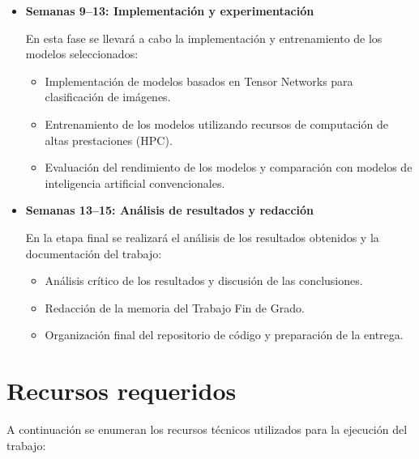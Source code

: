 \begin{itemize}
\item \textbf{Semanas 9--13: Implementación y experimentación}

En esta fase se llevará a cabo la implementación y entrenamiento de los modelos seleccionados:
\begin{itemize}
\item Implementación de modelos basados en Tensor Networks para clasificación de imágenes.
\item Entrenamiento de los modelos utilizando recursos de computación de altas prestaciones (HPC).
\item Evaluación del rendimiento de los modelos y comparación con modelos de inteligencia artificial convencionales.
\end{itemize}

\item \textbf{Semanas 13--15: Análisis de resultados y redacción}

En la etapa final se realizará el análisis de los resultados obtenidos y la documentación del trabajo:
\begin{itemize}
\item Análisis crítico de los resultados y discusión de las conclusiones.
\item Redacción de la memoria del Trabajo Fin de Grado.
\item Organización final del repositorio de código y preparación de la entrega.
\end{itemize}
\end{itemize}

\section{Recursos requeridos}

A continuación se enumeran los recursos técnicos utilizados para la ejecución del trabajo:

